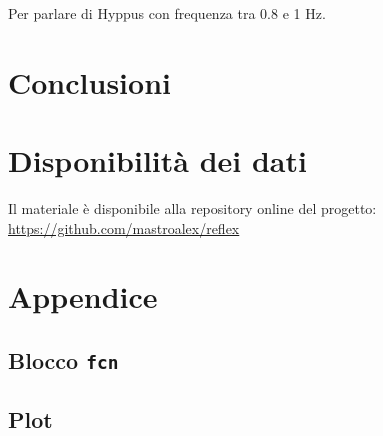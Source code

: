 Per parlare di Hyppus \cite{turnbull_origins_2017} con frequenza tra 0.8 e 1 Hz.

\section{Conclusioni}

\textcolor{blue}{\lipsum[1-2]}
\raggedbottom
\pagebreak
\section*{Disponibilità dei dati}

Il materiale è disponibile alla repository online del progetto: \url{https://github.com/mastroalex/reflex}


\raggedbottom
\printbibliography[title=Riferimenti]

\clearpage
\onecolumn
\section*{Appendice}

\subsection{Blocco \texttt{fcn}}
\label{sec:fcn}

\subsection{Plot}




